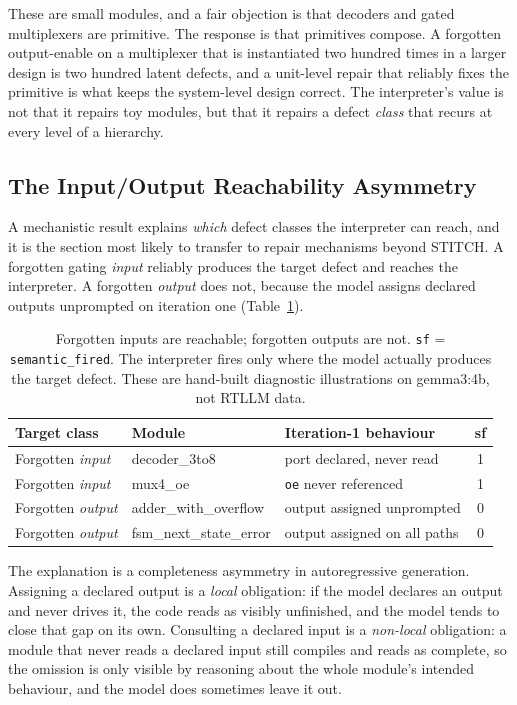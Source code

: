 \documentclass[11pt]{article}
\begin{document}
These are small modules, and a fair objection is that decoders and gated
multiplexers are primitive. The response is that primitives compose. A
forgotten output-enable on a multiplexer that is instantiated two hundred
times in a larger design is two hundred latent defects, and a unit-level
repair that reliably fixes the primitive is what keeps the system-level
design correct. The interpreter's value is not that it repairs toy modules,
but that it repairs a defect \emph{class} that recurs at every level of a
hierarchy.

\subsection{The Input/Output Reachability Asymmetry}
\label{sec:worked-asym}

A mechanistic result explains \emph{which} defect classes the interpreter can
reach, and it is the section most likely to transfer to repair mechanisms
beyond STITCH. A forgotten gating \emph{input} reliably produces the target
defect and reaches the interpreter. A forgotten \emph{output} does not,
because the model assigns declared outputs unprompted on iteration one
(Table~\ref{tab:asym}).

\begin{table}[htbp]
\centering
\caption{Forgotten inputs are reachable; forgotten outputs are not.
\texttt{sf} = \texttt{semantic\_fired}. The interpreter fires only where the
model actually produces the target defect. These are hand-built diagnostic
illustrations on gemma3:4b, not RTLLM data.}
\label{tab:asym}
\small
\begin{tabularx}{\linewidth}{@{} l l X c @{}}
\toprule
\textbf{Target class} & \textbf{Module} & \textbf{Iteration-1 behaviour} & \textbf{sf} \\
\midrule
Forgotten \emph{input}  & decoder\_3to8 & port declared, never read & 1 \\
Forgotten \emph{input}  & mux4\_oe      & \texttt{oe} never referenced & 1 \\
Forgotten \emph{output} & adder\_with\_overflow & output assigned unprompted & 0 \\
Forgotten \emph{output} & fsm\_next\_state\_error & output assigned on all paths & 0 \\
\bottomrule
\end{tabularx}
\end{table}

The explanation is a completeness asymmetry in autoregressive generation.
Assigning a declared output is a \emph{local} obligation: if the model
declares an output and never drives it, the code reads as visibly unfinished,
and the model tends to close that gap on its own. Consulting a declared input
is a \emph{non-local} obligation: a module that never reads a declared input
still compiles and reads as complete, so the omission is only visible by
reasoning about the whole module's intended behaviour, and the model does
sometimes leave it out.
\end{document}
